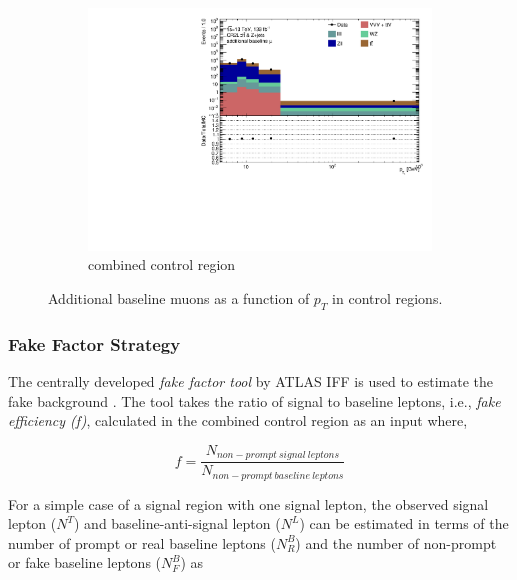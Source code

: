 \begin{figure}[htb]
\begin{subfigure}{.48\textwidth}
    \end{subfigure} \\
    \begin{subfigure}{.48\textwidth}
        \centering
        \includegraphics[width=.9\linewidth]{figures/Analysis/Background/Overlay_pt_Baseline_muons_Combined.pdf}
        \caption{combined control region \label{fig:Add_mu_combined}}
    \end{subfigure}
        \caption{ Additional baseline muons as a function of $p_{T}$ in control regions. \label{fig:ControlRegionsAdditionalBaselineMuonpT}}
\end{figure}

\subsubsection{ Fake Factor Strategy }
\label{subsubsec:EstimationStrategy}

The centrally developed \textit{fake factor tool} by ATLAS IFF is used to estimate the fake background \cite{FakeBkgTool}. The tool takes the ratio of signal to baseline leptons, i.e., \textit{fake efficiency (f)}, calculated in the combined control region as an input where,

\begin{equation}
f = \frac{N_{non-prompt~signal~leptons}}{N_{non-prompt~baseline~leptons}}
\end{equation}

For a simple case of a signal region with one signal lepton, the observed signal lepton ($N^{T}$) and baseline-anti-signal lepton ($N^{L}$) can be estimated in terms of the number of prompt or real baseline leptons ($N^{B}_{R}$) and the number of non-prompt or fake baseline leptons ($N^{B}_{F}$) as

